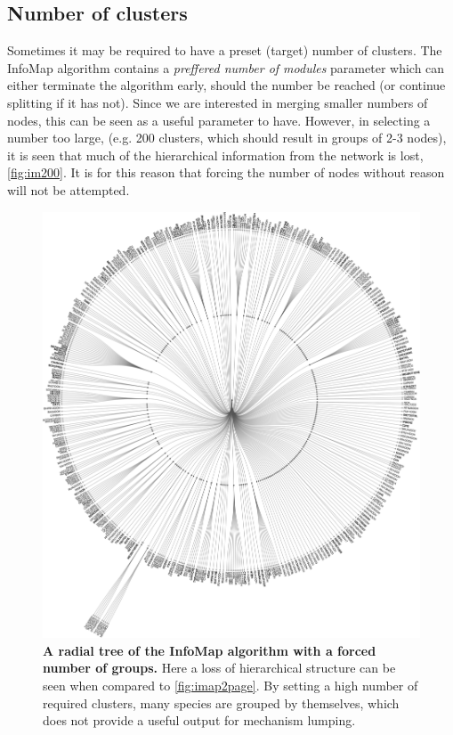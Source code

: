  \subsection{Number of clusters}
Sometimes it may be required to have a preset (target) number of clusters. The InfoMap algorithm contains a \emph{preffered number of modules} parameter which can either terminate the algorithm early, should the number be reached (or continue splitting if it has not). Since we are interested in merging smaller numbers of nodes, this can be seen as a useful parameter to have. However, in selecting a number too large, (e.g. 200 clusters, which should result in groups of 2-3 nodes), it is seen that much of the hierarchical information from the network is lost, \autoref{fig:im200}. It is for this reason that forcing the number of nodes without reason will not be attempted.


  \begin{figure}[H]
    \centering
    \includegraphics[width=.8\textwidth]{fig/manygroups.pdf}
    \caption{\textbf{A radial tree of the InfoMap algorithm with a forced number of groups.} Here a loss of hierarchical structure can be seen when compared to \autoref{fig:imap2page}. By setting a high number of required clusters, many species are grouped by themselves, which does not provide a useful output for mechanism lumping. }
        \label{fig:im200}
  \end{figure}






